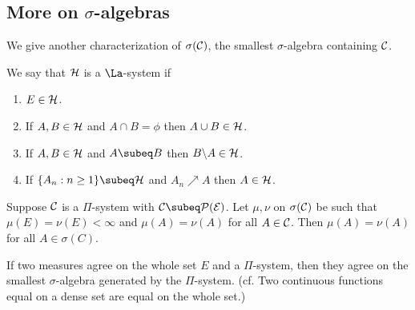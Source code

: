 

\subsection{More on $\sigma$-algebras}
We give another characterization of $\sigma(\cal C)$, the smallest $\sigma$-algebra containing $\cal C$. 
\begin{df}
We say that $\cal H$ is a $\La$-system if
\begin{enumerate}
\item
$E\in \cal H$.
\item 
If $A,B\in \cal H$ and $A\cap B=\phi$ then $A\cup B\in \cal H$.
\item
If $A,B\in \cal H$ and $A\subeq B$ then $B\backslash A\in \cal H$.
\item
If $\{A_n:n\geq 1\}\subeq \cal H$ and $A_n\nearrow A$ then $A\in \cal H$.
\end{enumerate}
\end{df}
\begin{thm}\label{pidet}
Suppose $\cal C$ is a $\Pi$-system with $\cal C\subeq \cal P(E)$. Let $\mu,\nu$ on $\sigma(\cal C)$ be such that $\mu(E)=\nu(E)<\infty$ and $\mu(A)=\nu(A)$ for all $A\in \cal C$. Then $\mu(A)=\nu(A)$ for all $A\in \sigma(C)$.
\end{thm}
If two measures agree on the whole set $E$ and a $\Pi$-system, then they agree on the smallest $\sigma$-algebra generated by the $\Pi$-system. (cf.  Two continuous functions equal on a dense set are equal on the whole set.)
